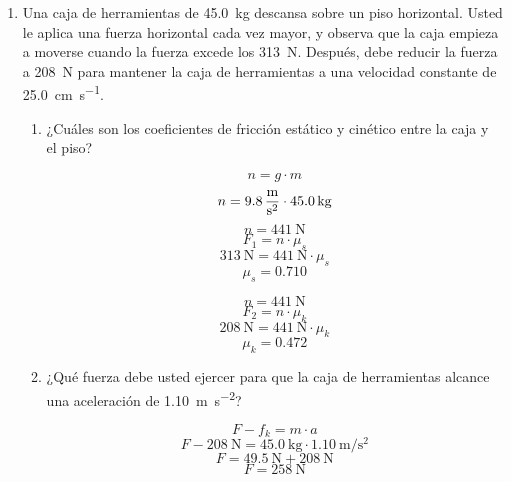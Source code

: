 \documentclass[../practica.root.tex]{subfiles}
\begin{document}
\begin{enumerate}
	\item Una caja de herramientas de \SI{45,0}{\kilogram} descansa sobre un piso horizontal. Usted le aplica
	      una fuerza horizontal cada vez mayor, y observa que la caja empieza a moverse cuando la
	      fuerza excede los \SI{313}{\newton}. Después, debe reducir la fuerza a \SI{208}{\newton} para mantener la caja de
	      herramientas a una velocidad constante de \SI[per-mode=symbol]{25,0}{\centi\meter\per\second}.
	      \begin{enumerate}
		      \item ¿Cuáles son los coeficientes de fricción estático y cinético entre la caja y el piso?
		            \begin{center}
			            \[ n = g\cdot m \]
			            \[ n = \gravity\cdot \SI{45,0}{\kilo\gram} \]
			            \[ n = \SI{441}{\newton} \]
			            \[ F_1 = n\cdot\mu_s \]
			            \[ \SI{313}{\newton} = \SI{441}{\newton}\cdot\mu_s \]
			            \[ \boxed{ \mu_s = \num{0,710} } \]
			            \[ n = \SI{441}{\newton} \]
			            \[ F_2 = n\cdot\mu_k \]
			            \[ \SI{208}{\newton} = \SI{441}{\newton}\cdot\mu_k \]
			            \[ \boxed{ \mu_k = \num{0,472} } \]
		            \end{center}
		      \item ¿Qué fuerza debe usted ejercer para que la caja de herramientas alcance una aceleración de \SI[per-mode=symbol]{1,10}{\meter\per\second\squared}?
		            \begin{center}
			            \[ F - f_k = m\cdot a \]
			            \[ F - \SI{208}{\newton} = \SI{45,0}{\kilo\gram}\cdot\SI{1,10}{\meter\per\second\squared} \]
			            \[ F = \SI{49,5}{\newton} + \SI{208}{\newton} \]
			            \[ F = \SI{258}{\newton} \]
		            \end{center}
	      \end{enumerate}
\end{enumerate}
\end{document}
